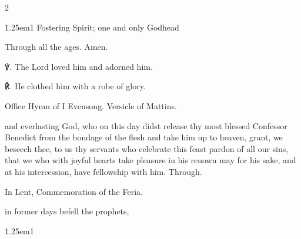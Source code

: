 \begin{paracol}{2}
\begin{hangparas}{1.25em}{1}
Fostering Spirit; one and only Godhead

Through all the ages. Amen.\\
\end{hangparas}

    ℣. The Lord loved him and adorned him.

	℟. He clothed him with a robe of glory.
	

\secondEvensong

\begin{rubric}
	Office Hymn of I Evensong. Versicle of Mattins.
\end{rubric}


\collect
{} and everlasting God, who on this day didst release thy most blessed Confessor Benedict from the bondage of the flesh and take him up to heaven, grant, we beseech thee, to us thy servants who celebrate this feast pardon of all our sins, that we who with joyful hearts take pleasure in his renown may for his sake, and at his intercession, have fellowship with him. Through.
\begin{rubric}
    In Lent, Commemoration of the Feria.
\end{rubric}

\switchcolumn
	
\vspace{-1\baselineskip}
	
\mattins
{}
	
	\mattinsInvitatoryHymn\label{BenedictInvitatory}
	
 in former days befell the prophets,

\begin{hangparas}{1.25em}{1}


\end{hangparas}
\end{paracol}
